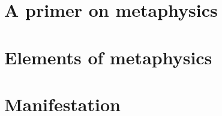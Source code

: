 \documentclass[a4paper,12pt,twoside]{book}
\begin{document}
\chapter{A primer on metaphysics}










\chapter{Elements of metaphysics}


















\chapter{Manifestation}




\end{document}
